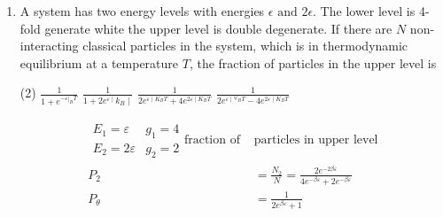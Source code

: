 \begin{enumerate}
\begin{answer}
		\begin{align*}
		F&=K_{B} T \ln \left[\frac{a_{O} V\left(K_{B} T\right)^{5 / 2}}{N}\right]^{N}\\
		F&= K_{B}+\ln z
		\intertext{compare 1 and 2, we get }
		\ln z&=-\ln \left[\frac{a_{0} V\left(K_{B} T\right)^{5 / 2}}{N}\right]^{N} \\
		\langle u\rangle&=-\frac{\partial}{\partial \beta} \ln z=+K T^{2} \frac{\partial}{\partial T} \ln z\\
		\langle u\rangle&=N K_{B} T^{2} \frac{\partial}{\partial T}\left(-\ln \left(\frac{a_{O} V\left(K_{B} T\right)^{5 / 2}}{N}\right)\right)\\
		&=N K_{B} T^{2} \frac{\partial}{\partial T}\left[-\ln T^{5 / 2}-\ln \left(\frac{a_{0} \cup K_{B}}{N}\right)\right]\\
		&=-\frac{5}{2} N K_{B} T^{2} \times \frac{1}{T} \\
		&=-\frac{5}{2} N K_{B} T
		\end{align*}
		So the correct answer is \textbf{Option (b)}
	\end{answer}
	\item A system has two energy levels with energies $\epsilon \text{ and }2\epsilon$. The lower level is 4-fold generate white the upper level is double degenerate. If there are $N$ non-interacting classical particles in the system, which is in thermodynamic equilibrium at a temperature $T$, the fraction of particles in the upper level is 
	\begin{tasks}(2)
		\task[\textbf{a.}] $\frac{1}{1+e^{-\left.\varepsilon\right|_{B} T}}$
		\task[\textbf{b.}] $\frac{1}{1+2 e^{\varepsilon \mid} k_{B} \mid}$
		\task[\textbf{c.}]$\frac{1}{2 e^{\varepsilon \mid K_{B} T}+4 e^{2 \varepsilon \mid K_{B} T}}$
		\task[\textbf{d.}] $\frac{1}{2 e^{\varepsilon \mid \forall_{B} T}-4 e^{2 \varepsilon \mid K_{B} T}}$
	\end{tasks}
	\begin{answer}
		\begin{align*}
		\begin{array}{ll}
		E_{1}=\varepsilon & g_{1}=4 \\
		E_{2}=2 \varepsilon & g_{2}=2
		\end{array}
		\text{fraction of }&\text{particles in upper level}\\
		P_{2}&=\frac{N_{2}}{N}=\frac{2 e^{-2 \beta \varepsilon}}{4 e^{-\beta \varepsilon}+2 e^{-\beta \varepsilon}}\\
		P_{\theta}&=\frac{1}{2 e^{\beta \varepsilon}+1}
		\end{align*}

\end{answer}
\end{enumerate}
